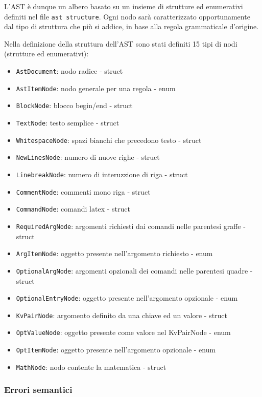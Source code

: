 \documentclass{article}
\begin{document}
    L'AST è dunque un albero basato su un insieme di strutture ed enumerativi definiti nel file \texttt{ast structure}. Ogni nodo sarà caratterizzato opportunamente dal tipo di struttura che più si addice, in base alla regola grammaticale d'origine.

    Nella definizione della struttura dell'AST sono stati definiti 15 tipi di nodi (strutture ed enumerativi):

    \begin{itemize}
        \item \texttt{AstDocument}: nodo radice - struct
        \item \texttt{AstItemNode}: nodo generale per una regola - enum
        \item \texttt{BlockNode}: blocco begin/end - struct
        \item \texttt{TextNode}: testo semplice - struct
        \item \texttt{WhitespaceNode}: spazi bianchi che precedono testo - struct
        \item \texttt{NewLinesNode}: numero di nuove righe - struct
        \item \texttt{LinebreakNode}: numero di interuzzione di riga - struct
        \item \texttt{CommentNode}: commenti mono riga - struct
        \item \texttt{CommandNode}: comandi latex - struct
        \item \texttt{RequiredArgNode}: argomenti richiesti dai comandi nelle parentesi graffe - struct
        \item \texttt{ArgItemNode}: oggetto presente nell'argomento richiesto - enum
        \item \texttt{OptionalArgNode}: argomenti opzionali dei comandi nelle parentesi quadre - struct
        \item \texttt{OptionalEntryNode}: oggetto presente nell'argomento opzionale - enum
        \item \texttt{KvPairNode}: argomento definito da una chiave ed un valore - struct
        \item \texttt{OptValueNode}: oggetto presente come valore nel KvPairNode - enum
        \item \texttt{OptItemNode}: oggetto presente nell'argomento opzionale - enum
        \item \texttt{MathNode}: nodo contente la matematica - struct
    \end{itemize}

    \subsubsection{Errori semantici}
\end{document}

